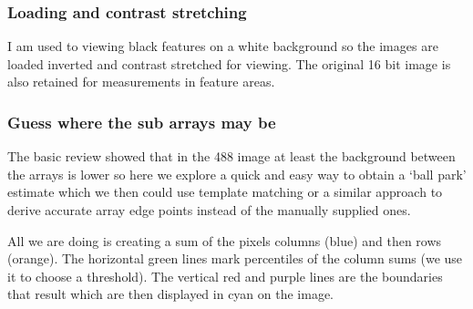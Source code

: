 \documentclass[
]{article}
\begin{document}
\hypertarget{loading-and-contrast-stretching}{%
\subsubsection{Loading and contrast
stretching}\label{loading-and-contrast-stretching}}

I am used to viewing black features on a white background so the images
are loaded inverted and contrast stretched for viewing. The original 16
bit image is also retained for measurements in feature areas.

\hypertarget{guess-where-the-sub-arrays-may-be}{%
\subsubsection{Guess where the sub arrays may
be}\label{guess-where-the-sub-arrays-may-be}}

The basic review showed that in the 488 image at least the background
between the arrays is lower so here we explore a quick and easy way to
obtain a `ball park' estimate which we then could use template matching
or a similar approach to derive accurate array edge points instead of
the manually supplied ones.

All we are doing is creating a sum of the pixels columns (blue) and then
rows (orange). The horizontal green lines mark percentiles of the column
sums (we use it to choose a threshold). The vertical red and purple
lines are the boundaries that result which are then displayed in cyan on
the image.
\end{document}

